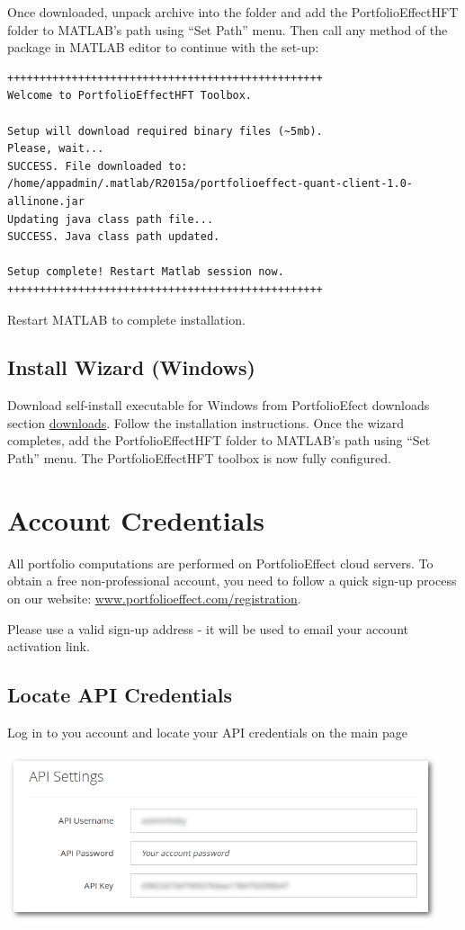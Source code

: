 \documentclass[letterpaper]{report}
\begin{document}
Once downloaded, unpack archive into the folder and add the 
PortfolioEffectHFT folder to MATLAB's path using ``Set Path'' menu. 
Then call any method of the package in
MATLAB editor to continue with the set-up:
\begin{lstlisting}
+++++++++++++++++++++++++++++++++++++++++++++++++
Welcome to PortfolioEffectHFT Toolbox.

Setup will download required binary files (~5mb).
Please, wait...
SUCCESS. File downloaded to: 
/home/appadmin/.matlab/R2015a/portfolioeffect-quant-client-1.0-allinone.jar
Updating java class path file...
SUCCESS. Java class path updated.

Setup complete! Restart Matlab session now.
+++++++++++++++++++++++++++++++++++++++++++++++++
\end{lstlisting}

Restart MATLAB to complete installation.

\section{Install Wizard (Windows)}
Download self-install executable for Windows from PortfolioEfect downloads
section \href{https://www.portfolioeffect.com/docs/platform/quant/downloads}{downloads}.
Follow the installation instructions. Once the wizard completes, add the 
PortfolioEffectHFT folder to MATLAB's path using ``Set Path''
menu.
The PortfolioEffectHFT toolbox is now fully configured.

\chapter{Account Credentials}
All portfolio computations are performed on PortfolioEffect cloud servers.
To obtain a free non-professional account, you need to follow a quick sign-up
process on our website:
\href{https://www.portfolioeffect.com/registration}{www.portfolioeffect.com/registration}.\par
Please use a valid sign-up address - it will be used to email your
account activation link.

\section{Locate API Credentials} 
Log in to you account and locate your API credentials on the main page

\includegraphics[width=5in,natwidth=768,natheight=300]{img/api-settings.png}
 
\end{document}
